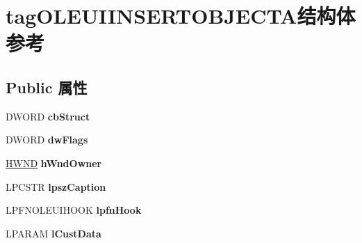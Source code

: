 \hypertarget{structtag_o_l_e_u_i_i_n_s_e_r_t_o_b_j_e_c_t_a}{}\section{tag\+O\+L\+E\+U\+I\+I\+N\+S\+E\+R\+T\+O\+B\+J\+E\+C\+T\+A结构体 参考}
\label{structtag_o_l_e_u_i_i_n_s_e_r_t_o_b_j_e_c_t_a}
\subsection*{Public 属性}
\begin{DoxyCompactItemize}
\item 
\mbox{\label{structtag_o_l_e_u_i_i_n_s_e_r_t_o_b_j_e_c_t_a_a5668f767a452a900bede4fe3c4924d0e}} 
D\+W\+O\+RD {\bfseries cb\+Struct}
\item 
\mbox{\label{structtag_o_l_e_u_i_i_n_s_e_r_t_o_b_j_e_c_t_a_a192330e3c5173b93c490ebdc765a5249}} 
D\+W\+O\+RD {\bfseries dw\+Flags}
\item 
\mbox{\label{structtag_o_l_e_u_i_i_n_s_e_r_t_o_b_j_e_c_t_a_a08afa0dd440f2977ca1e4e647761fda4}} 
\hyperlink{interfacevoid}{H\+W\+ND} {\bfseries h\+Wnd\+Owner}
\item 
\mbox{\label{structtag_o_l_e_u_i_i_n_s_e_r_t_o_b_j_e_c_t_a_ac657b68f411b3d029ada57957eb094cb}} 
L\+P\+C\+S\+TR {\bfseries lpsz\+Caption}
\item 
\mbox{\label{structtag_o_l_e_u_i_i_n_s_e_r_t_o_b_j_e_c_t_a_a25a6422174435dd8b3fda84afa8fb222}} 
L\+P\+F\+N\+O\+L\+E\+U\+I\+H\+O\+OK {\bfseries lpfn\+Hook}
\item 
\mbox{\label{structtag_o_l_e_u_i_i_n_s_e_r_t_o_b_j_e_c_t_a_a61fc1e6db3c319e7b28e2019c353aeb0}} 
L\+P\+A\+R\+AM {\bfseries l\+Cust\+Data}
\item 
\mbox{\label{structtag_o_l_e_u_i_i_n_s_e_r_t_o_b_j_e_c_t_a_aa55ea0b8f25d48017d87bd494a208e9c}} 

\end{DoxyCompactItemize}
